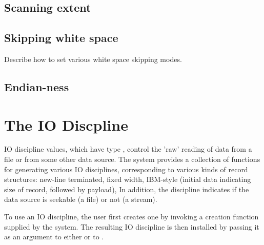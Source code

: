 \subsection{Scanning extent}
\label{sec:library-customization-scanning-extent}

\subsection{Skipping white space}
\label{sec:library-customization-white-space}
Describe how to set various white space skipping modes.




\subsection{Endian-ness}
\label{sec:library-customization-endian}


\section{The IO Discpline}
\label{sec:io-discipline}
IO discipline values, which have type , control the
'raw' reading of data from a file or from some other data source.  
The \pads{} system provides a collection of functions for generating
various IO disciplines, corresponding to various kinds of record
structures: new-line terminated, fixed width, IBM-style (initial data
indicating size of record, followed by payload), \etc{}  In addition,
the discipline indicates if the data source is seekable (a file) or
not (a stream).

To use an IO discipline, the user first creates one by invoking
a creation function supplied by the \pads{} system.  The resulting IO
discipline is then installed by passing it as an argument to either
 or to .

